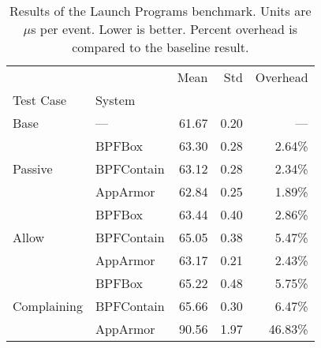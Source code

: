 \begin{table}[ht!]
\centering
\footnotesize
\caption[Results of the Launch Programs benchmark]{Results of the Launch Programs benchmark. Units are $\mu$s per event. Lower is better. Percent overhead is compared to the baseline result.}
\label{tab:phoronix-launch-programs}
\begin{tabular}{llrrr}
\toprule
            &          &   Mean &   Std & Overhead \\
Test Case & System &        &       &          \\
\midrule
Base & --- &  61.67 &  0.20 &      --- \\
\cline{1-5}
\multirow{3}{*}{Passive} & BPFBox &  63.30 &  0.28 &   2.64\% \\
            & BPFContain &  63.12 &  0.28 &   2.34\% \\
            & AppArmor &  62.84 &  0.25 &   1.89\% \\
\cline{1-5}
\multirow{3}{*}{Allow} & BPFBox &  63.44 &  0.40 &   2.86\% \\
            & BPFContain &  65.05 &  0.38 &   5.47\% \\
            & AppArmor &  63.17 &  0.21 &   2.43\% \\
\cline{1-5}
\multirow{3}{*}{Complaining} & BPFBox &  65.22 &  0.48 &   5.75\% \\
            & BPFContain &  65.66 &  0.30 &   6.47\% \\
            & AppArmor &  90.56 &  1.97 &  46.83\% \\
\bottomrule
\end{tabular}
\end{table}
